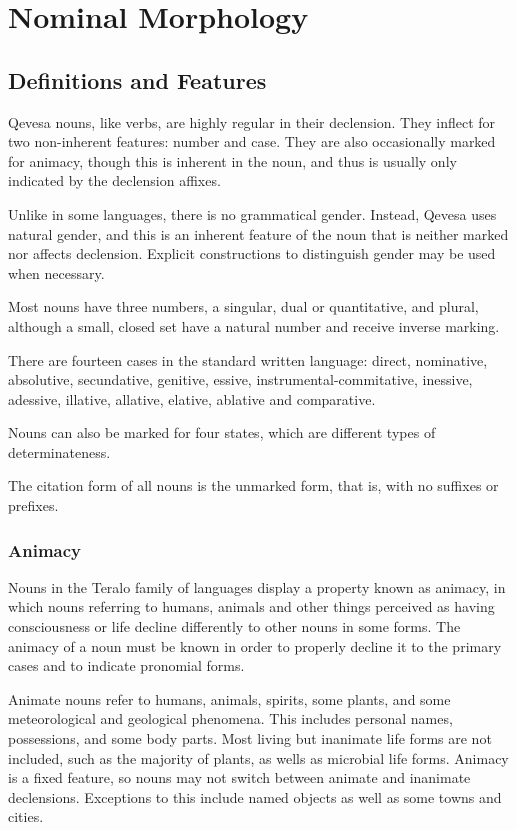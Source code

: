 \documentclass[grammar]{subfiles}
\begin{document}
\chapter{Nominal Morphology}
\label{ch:nominal_morphology}


\section{Definitions and Features}
\label{sec:nm_definition_features}

Qevesa nouns, like verbs, are highly regular in their declension.  They
inflect for two non-inherent features: number and case.  They are also
occasionally marked for animacy, though this is inherent in the noun, and
thus is usually only indicated by the declension affixes. 

Unlike in some languages, there is no grammatical gender.  Instead, Qevesa
uses natural gender, and this is an inherent feature of the noun that is
neither marked nor affects declension.  Explicit constructions to distinguish
gender may be used when necessary.

Most nouns have three numbers, a singular, dual or quantitative, and plural,
although a small, closed set have a natural number and receive inverse
marking. 

There are fourteen cases in the standard written language: direct, nominative,
absolutive, secundative, genitive, essive, instrumental-commitative,
inessive, adessive, illative, allative, elative, ablative and comparative.

Nouns can also be marked for four states, which are different types of determinateness.

The citation form of all nouns is the unmarked form, that is, with no suffixes or prefixes.


\subsection{Animacy}
\label{ssec:nm_animacy}

Nouns in the Teralo family of languages display a property known as animacy,
in which nouns referring to humans, animals and other things perceived as
having consciousness or life decline differently to other nouns in some
forms.  The animacy of a noun must be known in order to properly decline it
to the primary cases and to indicate pronomial forms.

Animate nouns refer to humans, animals, spirits, some plants, and some
meteorological and geological phenomena.  This includes personal names,
possessions, and some body parts.  Most living but inanimate life forms are
not included, such as the majority of plants, as wells as microbial life
forms.  Animacy is a fixed feature, so nouns may not switch between animate
and inanimate declensions.  Exceptions to this include named objects as well
as some towns and cities.
\end{document}
